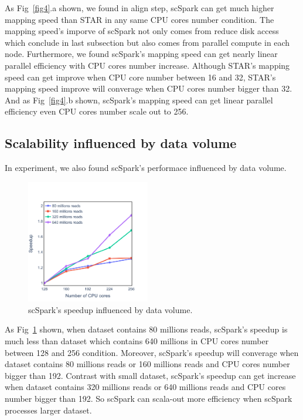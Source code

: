 \documentclass[conference]{IEEEtran}
\begin{document}
As Fig~\ref{fig4}.a shown, we found in align step, scSpark can get much higher mapping speed than STAR in any same CPU cores number condition.
The mapping speed's imporve of scSpark not only comes from reduce disk access which conclude in last subsection but also comes from parallel compute in each node.
Furthermore, we found scSpark's mapping speed can get nearly linear parallel efficiency with CPU cores number increase.
Although STAR's mapping speed can get improve when CPU core number between 16 and 32, STAR's mapping speed improve will converage when CPU cores number bigger than 32.
And as Fig~\ref{fig4}.b shown, scSpark's mapping speed can get linear parallel efficiency even CPU cores number scale out to 256.

\subsection{Scalability influenced by data volume}
In experiment, we also found scSpark's performace influenced by data volume.

\begin{figure}
	\includegraphics[width=0.48\textwidth]{fig5.pdf}
	\caption{scSpark's speedup influenced by data volume.} \label{fig5}
\end{figure}
As Fig~\ref{fig5} shown, when dataset contains 80 millions reads, scSpark's speedup is much less than dataset which contains 640 millions in CPU cores number between 128 and 256 condition.
Moreover, scSpark's speedup will converage when dataset contains 80 millions reads or 160 millions reads and CPU cores number bigger than 192.
Contrast with small dataset, scSpark's speedup can get increase when dataset contains 320 millions reads or 640 millions reads and CPU cores number bigger than 192.
So scSpark can scala-out more efficiency when scSpark processes larger dataset.
\end{document}
